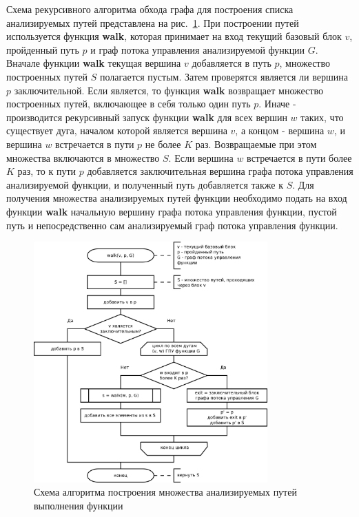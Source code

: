 Схема рекурсивного алгоритма обхода графа для построения списка анализируемых путей представлена на рис.~\ref{fig:build-pathes}. При построении путей используется функция \textbf{walk}, которая принимает на вход текущий базовый блок $v$, пройденный путь $p$ и граф потока управления анализируемой функции $G$. Вначале функции \textbf{walk} текущая вершина $v$ добавляется в путь $p$, множество построенных путей $S$ полагается пустым. Затем проверятся является ли вершина $p$ заключительной. Если является, то функция \textbf{walk} возвращает множество построенных путей, включающее в себя только один путь $p$. Иначе - производится рекурсивный запуск функции \textbf{walk} для всех вершин $w$ таких, что существует дуга, началом которой является вершина $v$, а концом - вершина $w$, и вершина $w$ встречается в пути $p$ не более $K$ раз. Возвращаемые при этом  множества включаются в множество $S$. Если вершина $w$ встречается в пути более $K$ раз, то к пути $p$ добавляется заключительная вершина графа потока управления анализируемой функции, и полученный путь добавляется также к $S$. Для получения множества анализируемых путей функции необходимо подать на вход функции \textbf{walk} начальную вершину графа потока управления функции, пустой путь и непосредственно сам анализируемый граф потока управления функции.

\begin{figure}
  \centering
  \includegraphics[width=0.8\textwidth]{inc/dia/build-pathes}
  \caption{Схема алгоритма построения множества анализируемых путей выполнения функции}
  \label{fig:build-pathes}
\end{figure}
 
